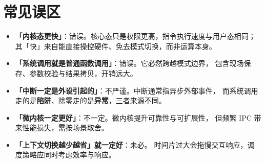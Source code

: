 \section{常见误区}

\begin{itemize}
    \item \textbf{「内核态更快」}：错误。核心态只是权限更高，指令执行速度与用户态相同；
        其「快」来自能直接操控硬件、免去模式切换，而非运算本身。
    \item \textbf{「系统调用就是普通函数调用」}：错误。它必然跨越模式边界，
        包含现场保存、参数校验与结果拷贝，开销远大。
    \item \textbf{「中断一定是外设引起的」}：不严谨。中断通常指异步外部事件，
        而系统调用走的是\textbf{陷阱}、除零走的是\textbf{异常}，三者来源不同。
    \item \textbf{「微内核一定更好」}：不一定。微内核提升可靠性与可扩展性，
        但频繁 IPC 带来性能损失，需按场景取舍。
    \item \textbf{「上下文切换越少越省」就一定好}：未必。
        时间片过大会拖慢交互响应，调度策略应同时考虑效率与响应。
\end{itemize}
